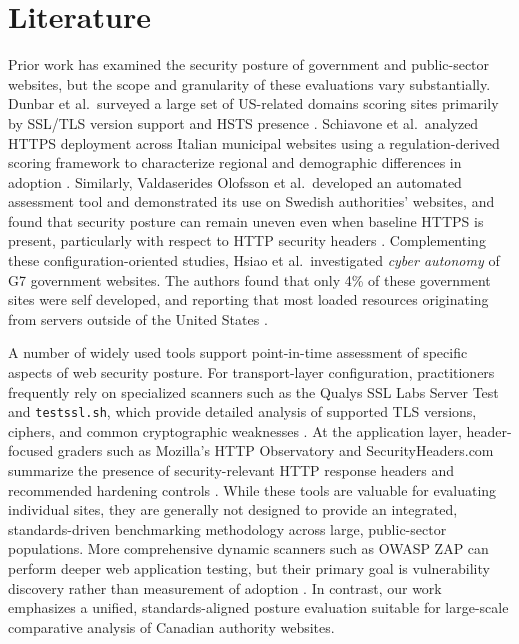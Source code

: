 \documentclass[conference]{IEEEtran}
\begin{document}
\section{Literature}

Prior work has examined the security posture of government and public-sector websites, but the scope and
granularity of these evaluations vary substantially. Dunbar et al.\ surveyed a large set
of US-related domains scoring sites primarily by SSL/TLS version support and HSTS presence \cite{dunbar4240917survey}. 
Schiavone et al.\ analyzed HTTPS deployment across Italian
municipal websites using a regulation-derived scoring framework to characterize regional and demographic
differences in adoption \cite{schiavone2024municipality2https}. Similarly, Valdaserides Olofsson
et al.\ developed an automated assessment tool and demonstrated its use on Swedish authorities’ websites,
and found that security posture can remain uneven even when baseline HTTPS is present, particularly with
respect to HTTP security headers \cite{valdaserides2024automated}. Complementing these configuration-oriented
studies, Hsiao et al.\ investigated \emph{cyber autonomy} of G7 government websites. The authors found that
only 4\% of these government sites were self developed, and reporting that most loaded resources originating 
from servers outside of the United States \cite{hsiao2019cyberautonomy}.

A number of widely used tools support point-in-time assessment of specific aspects of web security posture.
For transport-layer configuration, practitioners frequently rely on specialized scanners such as the Qualys
SSL Labs Server Test and \texttt{testssl.sh}, which provide detailed analysis of supported TLS versions, ciphers,
and common cryptographic weaknesses \cite{tool_ssllabs_ssltest,tool_testsslsh}. At the application layer,
header-focused graders such as Mozilla's HTTP Observatory and SecurityHeaders.com summarize the presence of
security-relevant HTTP response headers and recommended hardening controls
\cite{tool_mozilla_observatory,tool_securityheaders}. While these tools are valuable for evaluating individual
sites, they are generally not designed to provide an integrated, standards-driven benchmarking methodology
across large, public-sector populations. More comprehensive dynamic scanners such as OWASP ZAP can perform deeper web application
testing, but their primary goal is vulnerability discovery rather than measurement of adoption
\cite{tool_owasp_zap}. In contrast, our work emphasizes a unified, standards-aligned posture evaluation suitable
for large-scale comparative analysis of Canadian authority websites.
\end{document}

